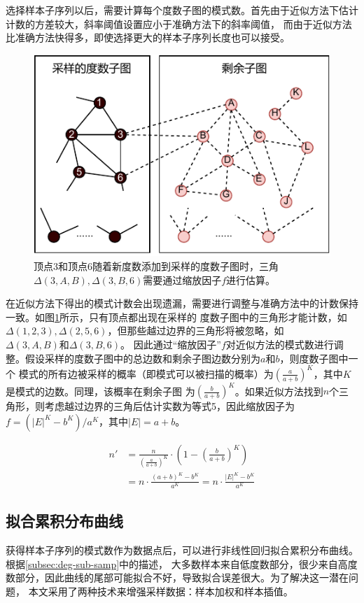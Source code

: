 \documentclass[master]{thesis-uestc}
\begin{document}
    选择样本子序列以后，需要计算每个度数子图的模式数。首先由于近似方法下估计计数的方差较大，斜率阈值设置应小于准确方法下的斜率阈值，
而由于近似方法比准确方法快得多，即使选择更大的样本子序列长度也可以接受。
    
    \begin{figure}[t]
        \centering
        \includegraphics[width=.7\linewidth]{pic/error.pdf}
        \caption{顶点3和顶点6随着新度数添加到采样的度数子图时，三角$\Delta(3,A,B),\Delta(3,B,6)$需要通过缩放因子$f$进行估算。}
        \label{fig:error}
      \end{figure}

    在近似方法下得出的模式计数会出现遗漏，需要进行调整与准确方法中的计数保持一致。如图\ref{fig:error}所示，只有顶点都出现在采样的
度数子图中的三角形才能计数，如$\Delta(1,2,3), \Delta(2,5,6)$，但那些越过边界的三角形将被忽略，如$\Delta(3,A,B)和\Delta(3,B,6)$。
因此通过“缩放因子”$f$对近似方法的模式数进行调整。假设采样的度数子图中的总边数和剩余子图边数分别为$a$和$b$，则度数子图中一个
模式的所有边被采样的概率（即模式可以被扫描的概率）为$\left(\frac{a}{a+b}\right)^K$，其中$K$是模式的边数。同理，该概率在剩余子图
为$\left(\frac{b}{a+b}\right)^K$。如果近似方法找到$n$个三角形，则考虑越过边界的三角后估计实数为等式5，因此缩放因子为$f=(|E|^K-b^K)/a^K$，其中$|E|=a+b$。

\begin{equation}
  \label{eq:scaling-factor}
  \begin{split}
    n' &= \frac{n}{\left(\frac{a}{a+b}\right)^K} \cdot \left(1-\left(\frac{b}{a+b}\right)^K\right)\\
       & = n\cdot \frac{(a+b)^K-b^K}{a^K} = n\cdot \frac{|E|^K-b^K}{a^K}
  \end{split}
\end{equation}

\subsection{拟合累积分布曲线}
\label{sec:fit-formula}
    获得样本子序列的模式数作为数据点后，可以进行非线性回归拟合累积分布曲线。根据\ref{subsec:deg-sub-samp}中的描述，
大多数样本来自低度数部分，很少来自高度数部分，因此曲线的尾部可能拟合不好，导致拟合误差很大。为了解决这一潜在问题，
本文采用了两种技术来增强采样数据：样本加权和样本插值。
\end{document}
